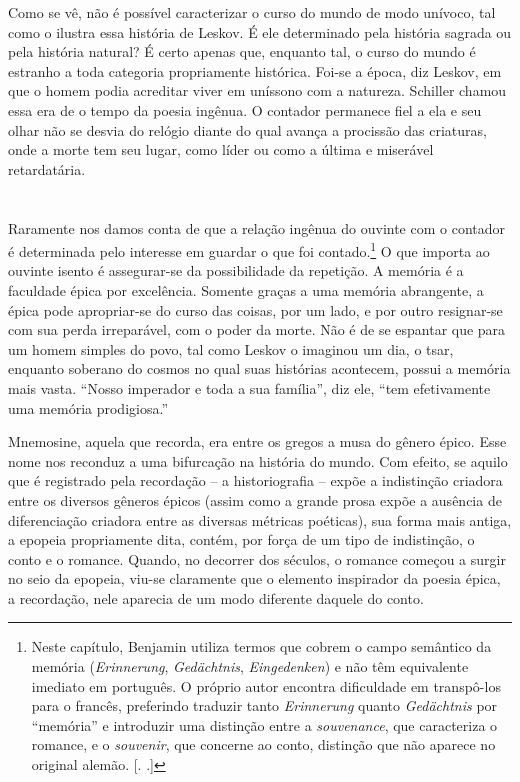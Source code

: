 Como se vê, não é possível caracterizar o curso do mundo de modo
unívoco, tal como o ilustra essa história de Leskov. É ele determinado
pela história sagrada ou pela história natural? É certo apenas que,
enquanto tal, o curso do mundo é estranho a toda categoria propriamente
histórica. Foi-se a época, diz Leskov, em que o homem podia acreditar
viver em uníssono com a natureza. Schiller chamou essa era de o tempo da
poesia ingênua. O contador permanece fiel a ela e seu olhar não se
desvia do relógio diante do qual avança a procissão das criaturas, onde
a morte tem seu lugar, como líder ou como a última e miserável retardatária.

\section{}

Raramente nos damos conta de que a relação ingênua do ouvinte com o
contador é determinada pelo interesse em guardar o que foi contado.\footnote{Neste capítulo, Benjamin utiliza termos que cobrem o campo
  semântico da memória (\emph{Erinnerung}, \emph{Gedächtnis},
  \emph{Eingedenken}) e não têm equivalente imediato em português. O
  próprio autor encontra dificuldade em transpô-los para o francês,
  preferindo traduzir tanto \emph{Erinnerung} quanto \emph{Gedächtnis}
  por ``memória'' e introduzir uma distinção entre a \emph{souvenance},
  que caracteriza o romance, e o \emph{souvenir}, que concerne ao conto,
  distinção que não aparece no original alemão. [. .]} O
que importa ao ouvinte isento é assegurar-se da possibilidade da
repetição. A memória é a faculdade épica por excelência. Somente graças
a uma memória abrangente, a épica pode apropriar-se do curso das coisas,
por um lado, e por outro resignar-se com sua perda irreparável, com o
poder da morte. Não é de se espantar que para um homem simples do povo,
tal como Leskov o imaginou um dia, o tsar, enquanto soberano do cosmos
no qual suas histórias acontecem, possui a memória mais vasta. ``Nosso
imperador e toda a sua família'', diz ele, ``tem efetivamente uma memória
prodigiosa.''

Mnemosine, aquela que recorda, era entre os gregos a musa do gênero
épico. Esse nome nos reconduz a uma bifurcação na história do mundo. Com
efeito, se aquilo que é registrado pela recordação -- a historiografia
-- expõe a indistinção criadora entre os diversos gêneros épicos (assim
como a grande prosa expõe a ausência de diferenciação criadora entre as
diversas métricas poéticas), sua forma mais antiga, a epopeia
propriamente dita, contém, por força de um tipo de indistinção, o conto
e o romance. Quando, no decorrer dos séculos, o romance começou a surgir
no seio da epopeia, viu-se claramente que o elemento inspirador da
poesia épica, a recordação, nele aparecia de um modo diferente daquele
do conto.

